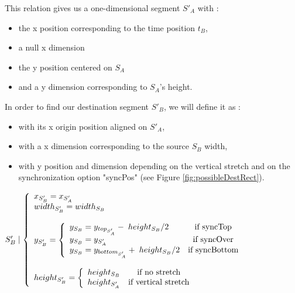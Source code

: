 \documentclass[a4paper]{article}
\begin{document}
This relation gives us a one-dimensional segment $S'_A$ with :
\begin{itemize}
  \item the x position corresponding to the time position $t_B$, 
  \item a null x dimension
  \item the y position centered on $S_A$
  \item and a y dimension corresponding to $S_A$'s height.
\end{itemize} 


In order to find our destination segment $S'_B$, we will define it as :
\begin{itemize}
  \item with its x origin position aligned on $S'_A$,
  \item with a x dimension corresponding to the source $S_B$ width,
  \item with y position and dimension depending on the vertical stretch and on the synchronization option "syncPos" (see Figure \ref{fig:possibleDestRect}).
\end{itemize}


$S'_B \mid \left\lbrace 
\begin{array}{lcl} 
x_{S'_B} = x_{S'_A}\\
\bigskip
width_{S'_B} = width_{S_B}\\
\bigskip
y _{S'_B} = \left\lbrace
\begin{array}{lcl}
y_{S_B} = y_{top_{S'_A}} - \hspace{1mm} height_{S_B}/2 & \text{if syncTop}\\ 
y_{S_B} = y_{S'_A} & \text{if syncOver}\\
y_{S_B} = y_{bottom_{S'_A}} + \hspace{1mm} height_{S_B}/2 & \text{if syncBottom}
\end{array}\right.\\
height _{S'_B} = \left\lbrace
\begin{array}{lcl}
height_{S_B} & \text{if no stretch}\\
height_{S'_A} & \text{if vertical stretch}
\end{array}\right.\\
\end{array}\right.$
\end{document}
